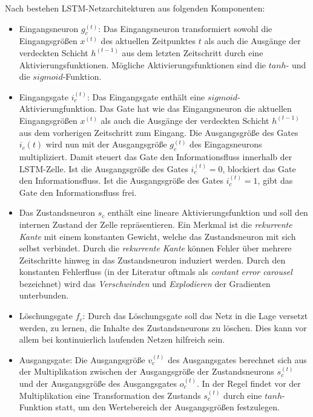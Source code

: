 Nach \cite{Lipton.5292015} bestehen LSTM-Netzarchitekturen aus folgenden Komponenten:

\begin{itemize}
	
	\item Eingangsneuron $g_c^{(t)}$: Das Eingangsneuron transformiert sowohl die Eingangsgrößen $x^{(t)}$ des aktuellen Zeitpunktes $t$ als auch die Ausgänge der verdeckten Schicht $h^{(t-1)}$ aus dem letzten Zeitschritt durch eine Aktivierungsfunktionen. Mögliche Aktivierungsfunktionen sind die $tanh$- und die $sigmoid$-Funktion.  
	\item Eingangsgate $i_c^{(t)}$: Das Eingangsgate enthält eine $sigmoid$-Aktivierungfunktion. Das Gate hat wie das Eingangsneuron die aktuellen Eingangsgrößen $x^{(t)}$ als auch die Ausgänge der verdeckten Schicht $h^{(t-1)}$ aus dem vorherigen Zeitschritt zum Eingang. Die Ausgangsgröße des Gates $i_c{(t)}$ wird nun mit der Ausgangsgröße $g_c^{(t)}$ des Eingagsneurons multipliziert. Damit steuert das Gate den Informationsfluss innerhalb der LSTM-Zelle. Ist die Ausgangsgröße des Gates $i_c^{(t)} = 0$, blockiert das Gate den Informationsfluss. Ist die Ausgangsgröße des Gates $i_c^{(t)}=1$, gibt das Gate den Informationsfluss frei.
	\item Das Zustandsneuron $s_c$ enthält eine lineare Aktivierungsfunktion und soll den internen Zustand der Zelle repräsentieren. Ein Merkmal ist die \textit{rekurrente Kante} mit einem konstanten Gewicht, welche das Zustandsneuron mit sich selbst verbindet. Durch die \textit{rekurrente Kante} können Fehler über mehrere Zeitschritte hinweg in das Zustandsneuron induziert werden. Durch den konstanten Fehlerfluss (in der Literatur oftmals als \textit{contant error carousel} bezeichnet) wird das \textit{Verschwinden} und \textit{Explodieren} der Gradienten unterbunden.
	\item Löschungsgate $f_c$: Durch das Löschungsgate soll das Netz in die Lage versetzt werden, zu lernen, die Inhalte des Zustandsneurons zu löschen. Dies kann vor allem bei kontinuierlich laufenden Netzen hilfreich sein.
	\item Ausgangsgate: Die Ausgangsgröße $v_c^{(t)}$ des Ausgangsgates berechnet sich aus der Multiplikation zwischen der Ausgangsgröße der Zustandsneurons $s_c^{(t)}$ und der Ausgangsgröße des Ausgangsgates $o_c^{(t)}$. In der Regel findet vor der Multiplikation eine Transformation des Zustands $s_c^{(t)}$ durch eine $tanh$-Funktion statt, um den Wertebereich der Ausgangsgrößen festzulegen. \cite{Lipton.5292015}
	
\end{itemize}

